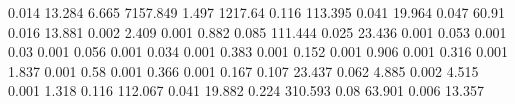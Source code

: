 0.014      13.284     %
6.665      7157.849   %
1.497      1217.64    %
0.116      113.395    %
0.041      19.964     %
0.047      60.91      %
0.016      13.881     %
0.002      2.409      %
0.001      0.882      %
0.085      111.444    %
0.025      23.436     %
0.001      0.053      %
0.001      0.03       %
0.001      0.056      %
0.001      0.034      %
0.001      0.383      %
0.001      0.152      %
0.001      0.906      %
0.001      0.316      %
0.001      1.837      %
0.001      0.58       %
0.001      0.366      %
0.001      0.167      %
0.107      23.437     %
0.062      4.885      %
0.002      4.515      %
0.001      1.318      %
0.116      112.067    %
0.041      19.882     %
0.224      310.593    %
0.08       63.901     %
0.006      13.357     %
